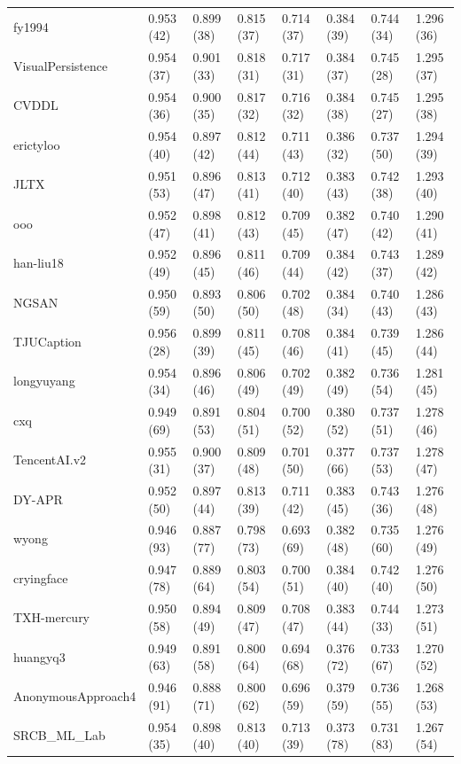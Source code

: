 \documentclass[english,twoside,openright]{HYgraduMLDS}
\begin{document}
\begin{appendices}
\begin{longtable}{l|l|l|l|l|l|l|l}
fy1994 & 0.953 (42) & 0.899 (38) & 0.815 (37) & 0.714 (37) & 0.384 (39) & 0.744 (34) & 1.296 (36) \\
VisualPersistence & 0.954 (37) & 0.901 (33) & 0.818 (31) & 0.717 (31) & 0.384 (37) & 0.745 (28) & 1.295 (37) \\
CVDDL & 0.954 (36) & 0.900 (35) & 0.817 (32) & 0.716 (32) & 0.384 (38) & 0.745 (27) & 1.295 (38) \\
erictyloo & 0.954 (40) & 0.897 (42) & 0.812 (44) & 0.711 (43) & 0.386 (32) & 0.737 (50) & 1.294 (39) \\
JLTX & 0.951 (53) & 0.896 (47) & 0.813 (41) & 0.712 (40) & 0.383 (43) & 0.742 (38) & 1.293 (40) \\
ooo & 0.952 (47) & 0.898 (41) & 0.812 (43) & 0.709 (45) & 0.382 (47) & 0.740 (42) & 1.290 (41) \\
han-liu18 & 0.952 (49) & 0.896 (45) & 0.811 (46) & 0.709 (44) & 0.384 (42) & 0.743 (37) & 1.289 (42) \\
NGSAN & 0.950 (59) & 0.893 (50) & 0.806 (50) & 0.702 (48) & 0.384 (34) & 0.740 (43) & 1.286 (43) \\
TJUCaption & 0.956 (28) & 0.899 (39) & 0.811 (45) & 0.708 (46) & 0.384 (41) & 0.739 (45) & 1.286 (44) \\
longyuyang & 0.954 (34) & 0.896 (46) & 0.806 (49) & 0.702 (49) & 0.382 (49) & 0.736 (54) & 1.281 (45) \\
cxq & 0.949 (69) & 0.891 (53) & 0.804 (51) & 0.700 (52) & 0.380 (52) & 0.737 (51) & 1.278 (46) \\
TencentAI.v2 & 0.955 (31) & 0.900 (37) & 0.809 (48) & 0.701 (50) & 0.377 (66) & 0.737 (53) & 1.278 (47) \\
DY-APR & 0.952 (50) & 0.897 (44) & 0.813 (39) & 0.711 (42) & 0.383 (45) & 0.743 (36) & 1.276 (48) \\
wyong & 0.946 (93) & 0.887 (77) & 0.798 (73) & 0.693 (69) & 0.382 (48) & 0.735 (60) & 1.276 (49) \\
cryingface & 0.947 (78) & 0.889 (64) & 0.803 (54) & 0.700 (51) & 0.384 (40) & 0.742 (40) & 1.276 (50) \\
\pagebreak TXH-mercury & 0.950 (58) & 0.894 (49) & 0.809 (47) & 0.708 (47) & 0.383 (44) & 0.744 (33) & 1.273 (51) \\
huangyq3 & 0.949 (63) & 0.891 (58) & 0.800 (64) & 0.694 (68) & 0.376 (72) & 0.733 (67) & 1.270 (52) \\
AnonymousApproach4 & 0.946 (91) & 0.888 (71) & 0.800 (62) & 0.696 (59) & 0.379 (59) & 0.736 (55) & 1.268 (53) \\
SRCB\_ML\_Lab & 0.954 (35) & 0.898 (40) & 0.813 (40) & 0.713 (39) & 0.373 (78) & 0.731 (83) & 1.267 (54) \\

\end{longtable}
\end{appendices}
\end{document}
